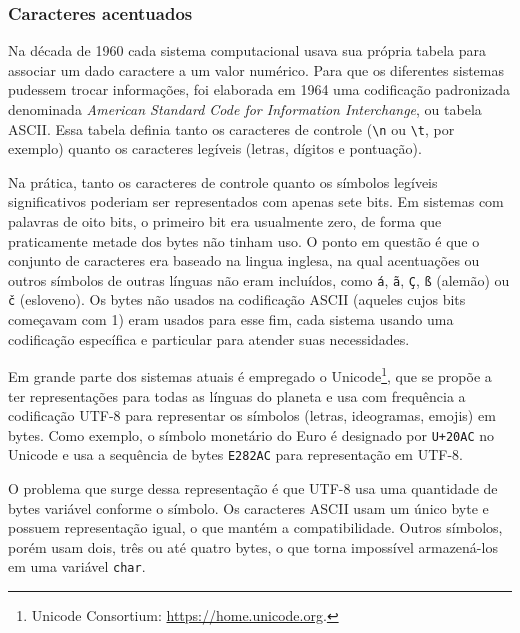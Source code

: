 \documentclass[
  letterpaper,
  DIV=11,
  numbers=noendperiod]{scrartcl}
\begin{document}
\subsubsection{Caracteres acentuados}\label{sec-caracteres-acentuados}

Na década de 1960 cada sistema computacional usava sua própria tabela
para associar um dado caractere a um valor numérico. Para que os
diferentes sistemas pudessem trocar informações, foi elaborada em 1964
uma codificação padronizada denominada \emph{American Standard Code for
Information Interchange}, ou tabela ASCII. Essa tabela definia tanto os
caracteres de controle (\texttt{\textbackslash{}n} ou
\texttt{\textbackslash{}t}, por exemplo) quanto os caracteres legíveis
(letras, dígitos e pontuação).

Na prática, tanto os caracteres de controle quanto os símbolos legíveis
significativos poderiam ser representados com apenas sete bits. Em
sistemas com palavras de oito bits, o primeiro bit era usualmente zero,
de forma que praticamente metade dos bytes não tinham uso. O ponto em
questão é que o conjunto de caracteres era baseado na lingua inglesa, na
qual acentuações ou outros símbolos de outras línguas não eram
incluídos, como \texttt{á}, \texttt{ã}, \texttt{Ç}, \texttt{ß} (alemão)
ou \texttt{č} (esloveno). Os bytes não usados na codificação ASCII
(aqueles cujos bits começavam com 1) eram usados para esse fim, cada
sistema usando uma codificação específica e particular para atender suas
necessidades.

  Em grande parte dos sistemas atuais é
empregado o Unicode\footnote{Unicode Consortium:
  \url{https://home.unicode.org}.}, que se propõe a ter representações
para todas as línguas do planeta e usa com frequência a codificação
UTF-8 para representar os símbolos (letras, ideogramas, emojis) em
bytes. Como exemplo, o símbolo monetário do Euro é designado por
\texttt{U+20AC} no Unicode e usa a sequência de bytes \texttt{E282AC}
para representação em UTF-8.

O problema que surge dessa representação é que UTF-8 usa uma quantidade
de bytes variável conforme o símbolo. Os caracteres ASCII usam um único
byte e possuem representação igual, o que mantém a compatibilidade.
Outros símbolos, porém usam dois, três ou até quatro bytes, o que torna
impossível armazená-los em uma variável \texttt{char}.
\end{document}
